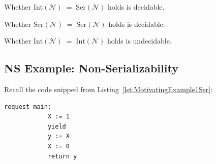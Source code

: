 \begin{theorem}[Serializability]
\label{thm:int-eq-ser}
Whether
\(
    \mathrm{Int}(\mathcal{N}) \;=\; \mathrm{Ser}(\mathcal{N})
\)
holds is decidable.
\end{theorem}

\begin{theorem}
\label{thm:ser-eq-ser}
Whether
\(
    \mathrm{Ser}(\mathcal{N}) \;=\; \mathrm{Ser}(\mathcal{N})
\)
holds is decidable.
\end{theorem}

\begin{theorem}
\label{thm:int-eq-int}
Whether
\(
    \mathrm{Int}(\mathcal{N}) \;=\; \mathrm{Int}(\mathcal{N})
\)
holds is undecidable.
\end{theorem}

\subsection{NS Example: Non-Serializability }
\label{sec:ns-non-serializable}

Recall the code snipped from Listing~\ref{lst:MotivatingExample1Ser}:


\begin{minipage}[t]{0.3\textwidth}
	\begin{lstlisting}[caption={Without yield or lock (serializable)},
			label={lst:MotivatingExample1Ser}]
	request main: 
			X := 1 
			yield
			y := X 
			X := 0
			return y 
		\end{lstlisting}
\end{minipage}


